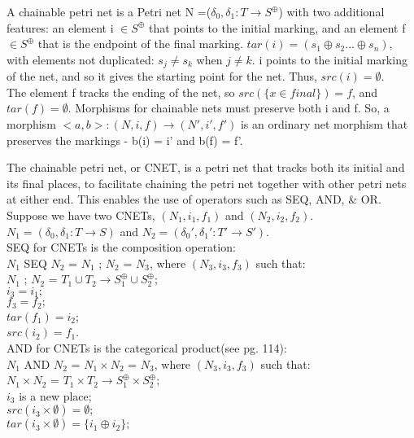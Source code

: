 %
\begin{definition}
\label{Chainable-Petri-Net}
A chainable petri net is a Petri net N =($\delta_0, \delta_1: T \rightarrow S^\oplus$) with two additional features: an element i $\in S^\oplus$ that points to the initial marking, and an element f $\in S^\oplus$ that is the endpoint of the final marking.  $tar(i)=(s_1 \oplus s_2 ... \oplus s_n)$, with elements not duplicated: $s_j \neq s_k$ when $j \neq k$. i points to the initial marking of the net, and so it gives the starting point for the net. Thus, $src(i) = \emptyset$.\\
The element f tracks the ending of the net, so $src(\{x\in final\})= f$, and $tar(f) = \emptyset$. Morphisms for chainable nets must preserve both i and f. So, a morphism $<a,b>: (N, i, f) \rightarrow (N', i', f')$ is an ordinary net morphism that preserves the markings - b(i) = i' and b(f) = f'. \\
\end{definition}
The chainable petri net, or CNET, is a petri net that tracks both its initial and its final places, to facilitate chaining the petri net together with other petri nets at either end. This enables the use of operators such as SEQ, AND, \& OR.\\
Suppose we have two CNETs, $(N_1, i_1, f_1)$ and $(N_2, i_2, f_2)$. \\
$N_1 = (\delta_0, \delta_1: T \rightarrow S)$ and $N_2 = (\delta_0', \delta_1': T' \rightarrow S')$.\bigskip\\
SEQ for CNETs is the composition operation:\\
$N_1$ SEQ $N_2$ = $N_1$ ; $N_2$ = $N_3$, where $(N_3,  i_3, f_3)$ such that:\\
$N_1$ ; $N_2$ = $T_1 \cup T_2 \rightarrow S_1^\oplus \cup S_2^\oplus$;\\
$i_3 = i_1;$\\
$f_3 = f_2;$\\
$tar(f_1) = i_2$;\\
$src(i_2) = f_1$.\bigskip\\
AND for CNETs is the categorical product(see pg. 114):\\
$N_1$ AND $N_2$ = $N_1 \times N_2$ = $N_3$, where $(N_3,  i_3, f_3)$ such that:\\
$N_1 \times N_2$ = $T_1 \times T_2 \rightarrow S_1^\oplus \times S_2^\oplus$;\\
$i_3$ is a new place;\\
$src(i_3 \times \emptyset) = \emptyset;$\\
$tar(i_3\times \emptyset) =\{i_1 \oplus i_2\};$\\
